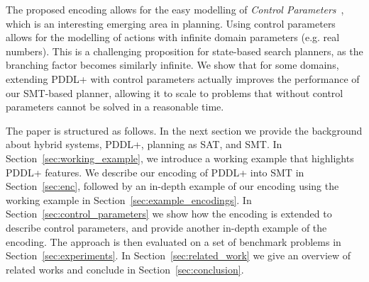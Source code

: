 The proposed encoding allows for the easy modelling of \textit{Control Parameters}~\cite{savas2016planning}, which is an interesting emerging area in planning. Using control parameters allows for the modelling of actions with infinite domain parameters (e.g. real numbers). This is a challenging proposition for state-based search planners, as the branching factor becomes similarly infinite. We show that for some domains, extending PDDL+ with control parameters actually improves the performance of our SMT-based planner, allowing it to scale to problems that without control parameters cannot be solved in a reasonable time.

The paper is structured as follows.
In the next section we provide the background about hybrid systems, PDDL+, planning as SAT, and SMT.
In Section~\ref{sec:working_example}, we introduce a working example that highlights PDDL+ features.
We describe our encoding of PDDL+ into SMT in Section~\ref{sec:enc}, followed by an in-depth example of our encoding using the working example in Section~\ref{sec:example_encodings}.
In Section~\ref{sec:control_parameters} we show how the encoding is extended to describe control parameters, and provide another in-depth example of the encoding.
The approach is then evaluated on a set of benchmark problems in Section~\ref{sec:experiments}.
In Section~\ref{sec:related_work} we give an overview of related works and conclude in Section~\ref{sec:conclusion}.
